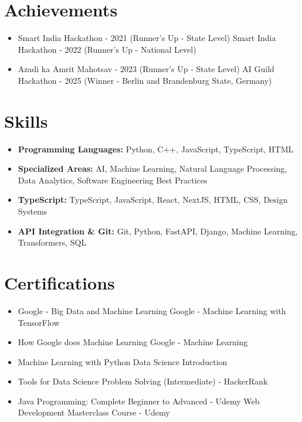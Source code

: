 \documentclass[a4paper,10pt]{article}
\begin{document}
\section*{Achievements}
\begin{itemize}
\item Smart India Hackathon - 2021 (Runner's Up - State Level) \hfill Smart India Hackathon - 2022 (Runner's Up - National Level)
\item Azadi ka Amrit Mahotsav - 2023 (Runner's Up - State Level) \hfill AI Guild Hackathon - 2025 (Winner - Berlin and Brandenburg State, Germany)
\end{itemize}

\section*{Skills}
\begin{itemize}
  \item \textbf{Programming Languages:} Python, C++, JavaScript, TypeScript, HTML
  \item \textbf{Specialized Areas:} AI, Machine Learning, Natural Language Processing, Data Analytics, Software Engineering Best Practices
  \item \textbf{TypeScript:} TypeScript, JavaScript, React, NextJS, HTML, CSS, Design Systems
  \item \textbf{API Integration \& Git:} Git, Python, FastAPI, Django, Machine Learning, Transformers, SQL
\end{itemize}

\section*{Certifications}
\begin{itemize}
\item Google - Big Data and Machine Learning \hfill Google - Machine Learning with TensorFlow
\item How Google does Machine Learning \hfill Google - Machine Learning
\item Machine Learning with Python \hfill Data Science Introduction
\item Tools for Data Science \hfill Problem Solving (Intermediate) - HackerRank
\item Java Programming: Complete Beginner to Advanced - Udemy \hfill Web Development Masterclass Course - Udemy
\end{itemize}
\end{document}
